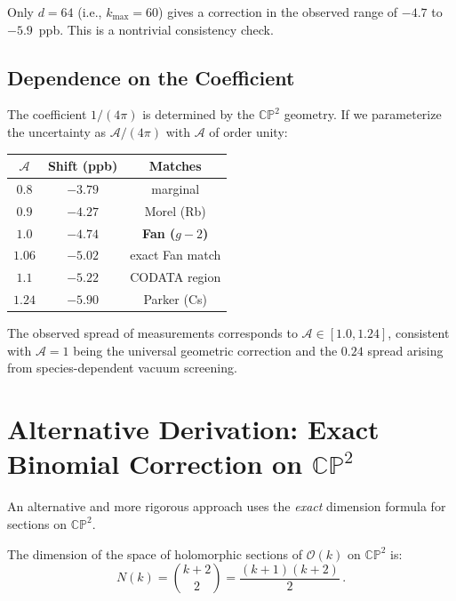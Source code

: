 \documentclass[12pt,a4paper]{article}
\theoremstyle{definition}
\theoremstyle{remark}
\newcommand{\CP}{\mathbb{CP}}
\begin{document}
Only $d = 64$ (i.e., $k_{\max} = 60$) gives a correction in the observed
range of $-4.7$ to $-5.9$~ppb. This is a nontrivial consistency check.

\subsection{Dependence on the Coefficient}

The coefficient $1/(4\pi)$ is determined by the $\CP^2$ geometry. If we
parameterize the uncertainty as $\mathcal{A}/(4\pi)$ with $\mathcal{A}$
of order unity:

\begin{center}
\begin{tabular}{ccc}
\toprule
$\mathcal{A}$ & Shift (ppb) & Matches \\
\midrule
$0.8$ & $-3.79$ & marginal \\
$0.9$ & $-4.27$ & Morel (Rb) \\
$\mathbf{1.0}$ & $\mathbf{-4.74}$ & \textbf{Fan (}$g{-}2$\textbf{)} \\
$1.06$ & $-5.02$ & exact Fan match \\
$1.1$ & $-5.22$ & CODATA region \\
$1.24$ & $-5.90$ & Parker (Cs) \\
\bottomrule
\end{tabular}
\end{center}

The observed spread of measurements corresponds to
$\mathcal{A} \in [1.0, 1.24]$, consistent with $\mathcal{A} = 1$ being
the universal geometric correction and the $0.24$ spread arising from
species-dependent vacuum screening.

\section{Alternative Derivation: Exact Binomial Correction on $\CP^2$}
\label{sec:alternative}

An alternative and more rigorous approach uses the \emph{exact} dimension
formula for sections on $\CP^2$.

The dimension of the space of holomorphic sections of $\mathcal{O}(k)$ on
$\CP^2$ is:
\begin{equation}
N(k) = \binom{k+2}{2} = \frac{(k+1)(k+2)}{2}\,.
\end{equation}
\end{document}
